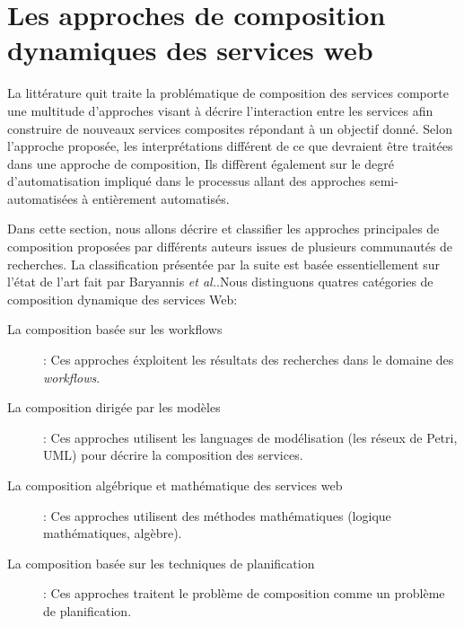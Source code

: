   \section{Les approches de composition dynamiques des services web}
  \label{sec:comp-dynam}

  La littérature quit traite la problématique de composition des
  services comporte une multitude d'approches visant à décrire
  l'interaction entre les services afin construire de nouveaux
  services composites répondant à un objectif donné. Selon l'approche
  proposée, les interprétations différent de ce que devraient être
  traitées dans une approche de composition, Ils diffèrent également
  sur le degré d'automatisation impliqué dans le processus allant des
  approches semi-automatisées à entièrement automatisés.

  Dans cette section, nous allons décrire et classifier les approches
  principales de composition proposées par différents auteurs issues
  de plusieurs communautés de recherches. La classification présentée
  par la suite est basée essentiellement sur l'état de l'art fait par
  Baryannis \emph{et al.}\cite{baryannis2010}.Nous distinguons quatres
  catégories de composition dynamique des services Web:
  \SpecialItem
  \begin{description}
  \item[La composition  basée sur les workflows]: Ces approches
    éxploitent les résultats des recherches dans le domaine des
    \textit{workflows}.

  \item[La composition dirigée par les modèles]: Ces approches
    utilisent les languages de modélisation (les réseux de Petri,
    \textsc{UML}) pour décrire la composition des services.

  \item[La composition algébrique et mathématique des services web]:
    Ces approches utilisent des méthodes mathématiques (logique
    mathématiques, algèbre).

  \item[La composition basée sur les techniques de planification]: Ces
    approches traitent le problème de composition comme un problème de
    planification.
  \end{description}


